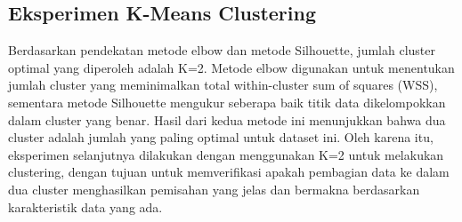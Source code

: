 \documentclass[
  oneside]{book}
\begin{document}
\subsection*{Eksperimen K-Means Clustering}\label{eksperimen-k-means-clustering}

Berdasarkan pendekatan metode elbow dan metode Silhouette, jumlah cluster optimal yang diperoleh adalah K=2. Metode elbow digunakan untuk menentukan jumlah cluster yang meminimalkan total within-cluster sum of squares (WSS), sementara metode Silhouette mengukur seberapa baik titik data dikelompokkan dalam cluster yang benar. Hasil dari kedua metode ini menunjukkan bahwa dua cluster adalah jumlah yang paling optimal untuk dataset ini. Oleh karena itu, eksperimen selanjutnya dilakukan dengan menggunakan K=2 untuk melakukan clustering, dengan tujuan untuk memverifikasi apakah pembagian data ke dalam dua cluster menghasilkan pemisahan yang jelas dan bermakna berdasarkan karakteristik data yang ada.
\end{document}
